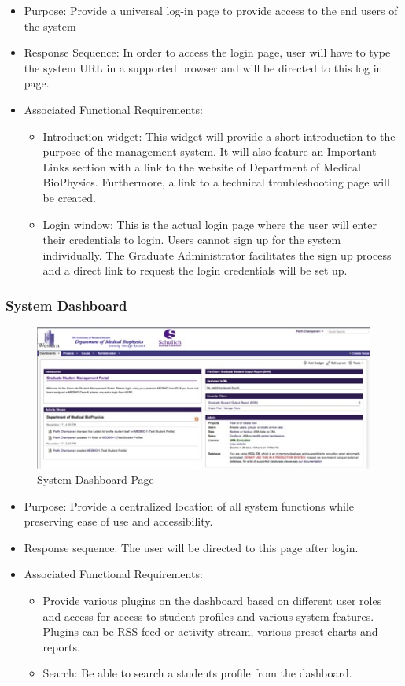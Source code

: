 \documentclass[11pt,a4paper]{report}
\begin{document}
\begin{itemize}
\item Purpose: Provide a universal log-in page to provide access to the end users of the system
\item Response Sequence: In order to access the login page, user will have to type the system URL in a supported browser and will be directed to this log in page. 
\item Associated Functional Requirements: 
\begin {itemize} 
\item Introduction widget: This widget will provide a short introduction to the purpose of the management system. It will also feature an Important Links section with a link to the website of Department of Medical BioPhysics. Furthermore, a link to a technical troubleshooting page will be created.
\item Login window: This is the actual login page where the user will enter their credentials to login. Users cannot sign up for the system individually. The Graduate Administrator facilitates the sign up process and a direct link to request the login credentials will be set up.
\end{itemize}
\end{itemize}


\subsubsection{ System Dashboard }
\begin{figure}[htp]
\centering
\includegraphics[scale=1]{diagrams/HTMLTemplating/Figure2.jpg}
\caption{System Dashboard Page}
\label{fig:SystemDashBoard}
\end{figure}

\begin{itemize}
\item Purpose: Provide a centralized location of all system functions while preserving ease of use and accessibility.
\item Response sequence: The user will be directed to this page after login.
\item Associated Functional Requirements:
\begin{itemize}
\item Provide various plugins on the dashboard based on different user roles and access for access to student profiles and various system features. Plugins can be RSS feed or activity stream, various preset charts and reports.
\item Search: Be able to search a students profile from the dashboard.
\end{itemize}
\end{itemize}
\end{document}
